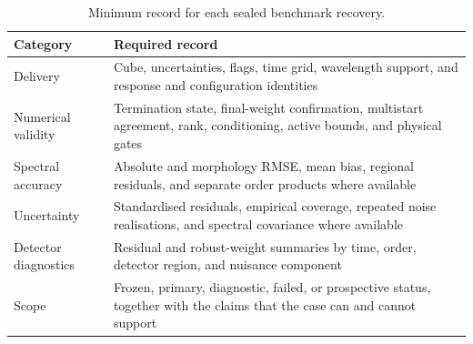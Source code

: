 \begin{table}[t]
 \centering
 \footnotesize
 \caption{Minimum record for each sealed benchmark recovery.}
 \label{tab:benchmark-report}
 \setlength{\tabcolsep}{3pt}
 \begin{tabularx}{0.97\columnwidth}{@{}>{\raggedright\arraybackslash}p{}>{\raggedright\arraybackslash}X@{}}
  \toprule
  Category & Required record \\
  \midrule
  Delivery & Cube, uncertainties, flags, time grid, wavelength support, and
  response and configuration identities \\
  Numerical validity & Termination state, final-weight confirmation,
  multistart agreement, rank, conditioning, active bounds, and physical gates \\
  Spectral accuracy & Absolute and morphology RMSE, mean bias, regional
  residuals, and separate order products where available \\
  Uncertainty & Standardised residuals, empirical coverage, repeated noise
  realisations, and spectral covariance where available \\
  Detector diagnostics & Residual and robust-weight summaries by time, order,
  detector region, and nuisance component \\
  Scope & Frozen, primary, diagnostic, failed, or prospective status, together
  with the claims that the case can and cannot support \\
  \bottomrule
 \end{tabularx}
\end{table}
